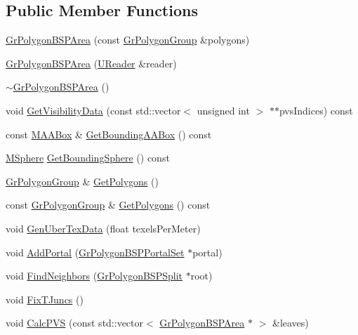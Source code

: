 \subsection*{Public Member Functions}
\begin{CompactItemize}
\item 
\hyperlink{class_gr_polygon_b_s_p_area_9fdd7b9d43647ca566f1c00b20fc11ba}{GrPolygonBSPArea} (const \hyperlink{class_gr_polygon_group}{GrPolygonGroup} \&polygons)
\item 
\hyperlink{class_gr_polygon_b_s_p_area_c7e3331609edd245efdba8ef8b7e8cc4}{GrPolygonBSPArea} (\hyperlink{class_u_reader}{UReader} \&reader)
\item 
\hyperlink{class_gr_polygon_b_s_p_area_5892b7c346ad8b00b9c384211e9ed12d}{$\sim$GrPolygonBSPArea} ()
\item 
void \hyperlink{class_gr_polygon_b_s_p_area_15324cca2e63613b45d88de81b4f8666}{GetVisibilityData} (const std::vector$<$ unsigned int $>$ $\ast$$\ast$pvsIndices) const 
\item 
const \hyperlink{class_m_a_a_box}{MAABox} \& \hyperlink{class_gr_polygon_b_s_p_area_dab93dce455697f234e10a72b57806c9}{GetBoundingAABox} () const 
\item 
\hyperlink{class_m_sphere}{MSphere} \hyperlink{class_gr_polygon_b_s_p_area_3cc8969be9caa17c5beae9ff355ea462}{GetBoundingSphere} () const 
\item 
\hyperlink{class_gr_polygon_group}{GrPolygonGroup} \& \hyperlink{class_gr_polygon_b_s_p_area_63247847ab821f68c3c8d6b166ebc419}{GetPolygons} ()
\item 
const \hyperlink{class_gr_polygon_group}{GrPolygonGroup} \& \hyperlink{class_gr_polygon_b_s_p_area_bf71c666d5f57293255b47e577b6f757}{GetPolygons} () const 
\item 
void \hyperlink{class_gr_polygon_b_s_p_area_ced30316ed0ae05a05b8b5242ae9cc73}{GenUberTexData} (float texelsPerMeter)
\item 
void \hyperlink{class_gr_polygon_b_s_p_area_e32bb3ed77dc93651dbbaaf8ae55b5c8}{AddPortal} (\hyperlink{class_gr_polygon_b_s_p_portal_set}{GrPolygonBSPPortalSet} $\ast$portal)
\item 
void \hyperlink{class_gr_polygon_b_s_p_area_5149561c0870fd83f3a77d3e9b94072e}{FindNeighbors} (\hyperlink{class_gr_polygon_b_s_p_split}{GrPolygonBSPSplit} $\ast$root)
\item 
void \hyperlink{class_gr_polygon_b_s_p_area_2d77bc4b77ace5d859713e906db5e295}{FixTJuncs} ()
\item 
void \hyperlink{class_gr_polygon_b_s_p_area_93c40f74ada66587db01a2c044421d02}{CalcPVS} (const std::vector$<$ \hyperlink{class_gr_polygon_b_s_p_area}{GrPolygonBSPArea} $\ast$ $>$ \&leaves)
$$
\end{CompactItemize}
